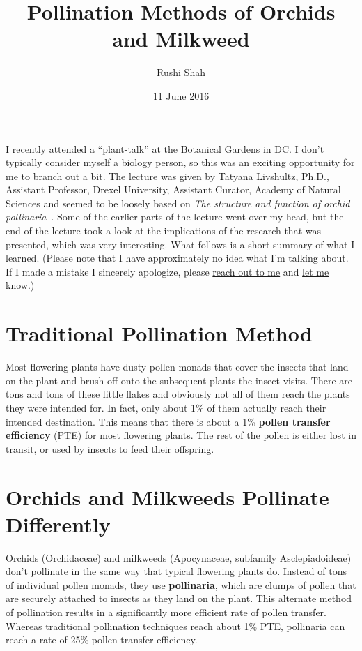 \documentclass[12pt]{article}
\author{Rushi Shah}
\date{11 June 2016}
\title{Pollination Methods of Orchids and Milkweed}
\begin{document}
\maketitle

I recently attended a ``plant-talk'' at the Botanical Gardens in DC. I don't typically consider myself a biology person, so this was an exciting opportunity for me to branch out a bit. \href{https://www.usbg.gov/events/2016/05/18/lecture-milkweeds-and-orchids-survival-most-efficient}{The lecture} was given by Tatyana Livshultz, Ph.D., Assistant Professor, Drexel University, Assistant Curator, Academy of Natural Sciences and seemed to be loosely based on \textit{The structure and function of orchid pollinaria}~\cite{Johnson2000}. Some of the earlier parts of the lecture went over my head, but the end of the lecture took a look at the implications of the research that was presented, which was very interesting. What follows is a short summary of what I learned. (Please note that I have approximately no idea what I'm talking about. If I made a mistake I sincerely apologize, please \href{https://twitter.com/2016rshah}{reach out to me} and \href{https://github.com/2016rshah/blog/issues/new}{let me know}.)

\section{Traditional Pollination Method}

  Most flowering plants have dusty pollen monads that cover the insects that land on the plant and brush off onto the subsequent plants the insect visits. There are tons and tons of these little flakes and obviously not all of them reach the plants they were intended for. In fact, only about 1\% of them actually reach their intended destination. This means that there is about a 1\% \textbf{pollen transfer efficiency}  (PTE) for most flowering plants. The rest of the pollen is either lost in transit, or used by insects to feed their offspring. 


\section{Orchids and Milkweeds Pollinate Differently}

  Orchids (Orchidaceae) and milkweeds (Apocynaceae, subfamily Asclepiadoideae) don't pollinate in the same way that typical flowering plants do. Instead of tons of individual pollen monads, they use \textbf{pollinaria}, which are clumps of pollen that are securely attached to insects as they land on the plant. This alternate method of pollination results in a significantly more efficient rate of pollen transfer. Whereas traditional pollination techniques reach about 1\% PTE, pollinaria can reach a rate of 25\% pollen transfer efficiency. 
\end{document}
